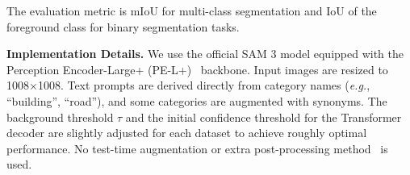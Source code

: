 \documentclass[twocolumn,switch,times]{article}
\begin{document}
The evaluation metric is mIoU for multi-class segmentation and IoU of the foreground class for binary segmentation tasks.


\noindent
\textbf{Implementation Details.} We use the official SAM 3 model equipped with the Perception Encoder-Large+ (PE-L+)~\citep{bolya2025perception} backbone. Input images are resized to 1008$\times$1008. Text prompts are derived directly from category names (\textit{e.g.}, ``building'', ``road''), and some categories are augmented with synonyms. The background threshold $\tau$ and the initial confidence threshold for the Transformer decoder are slightly  adjusted for each dataset to achieve roughly optimal performance. No test-time augmentation or extra post-processing method~\citep{araslanov2020single} is used.
\end{document}
